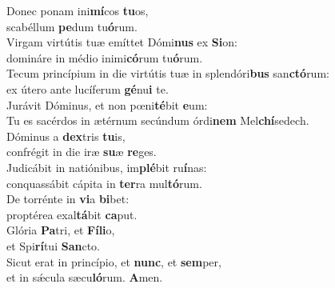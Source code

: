 \evenverse Donec ponam ini\textbf{mí}cos \textbf{tu}os,~\*\\
\evenverse scabéllum \textbf{pe}dum tu\textbf{ó}rum.\\
\oddverse Virgam virtútis tuæ emíttet Dómi\textbf{nus} ex \textbf{Si}on:~\*\\
\oddverse domináre in médio inimi\textbf{có}rum tu\textbf{ó}rum.\\
\evenverse Tecum princípium in die virtútis tuæ in splendóri\textbf{bus} san\textbf{ctó}rum:~\*\\
\evenverse ex útero ante lucíferum \textbf{gé}nu\textbf{i} te.\\
\oddverse Jurávit Dóminus, et non pœni\textbf{té}bit \textbf{e}um:~\*\\
\oddverse Tu es sacérdos in ætérnum secúndum órdi\textbf{nem} Mel\textbf{chí}sedech.\\
\evenverse Dóminus a \textbf{dex}tris \textbf{tu}is,~\*\\
\evenverse confrégit in die iræ \textbf{su}æ \textbf{re}ges.\\
\oddverse Judicábit in natiónibus, im\textbf{plé}bit ru\textbf{í}nas:~\*\\
\oddverse conquassábit cápita in \textbf{ter}ra mul\textbf{tó}rum.\\
\evenverse De torrénte in \textbf{vi}a \textbf{bi}bet:~\*\\
\evenverse proptérea exal\textbf{tá}bit \textbf{ca}put.\\
\oddverse Glória \textbf{Pa}tri, et \textbf{Fí}\textbf{li}o,~\*\\
\oddverse et Spi\textbf{rí}tui \textbf{San}cto.\\
\evenverse Sicut erat in princípio, et \textbf{nunc}, et \textbf{sem}per,~\*\\
\evenverse et in sǽcula sæcu\textbf{ló}rum. \textbf{A}men.\\
